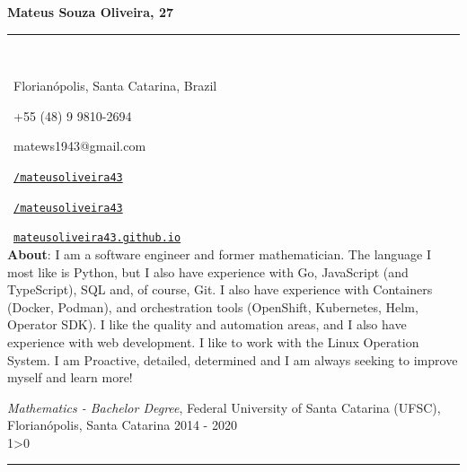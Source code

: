 \documentclass[a4paper,10pt]{article}
\makeatletter
\newcommand{\professional}{Mateus Souza Oliveira}
\newcommand{\age}{27}
\newcommand{\address}{Florianópolis, Santa Catarina, Brazil}
\newcommand{\phone}{+55 (48) 9 9810-2694}
\newcommand{\email}{matews1943@gmail.com}
\newcommand{\about}{
    I am a software engineer and former mathematician. The language I most like is Python, but I also have experience with Go, JavaScript (and TypeScript), SQL and, of course, Git. I also have experience with Containers (Docker, Podman), and orchestration tools (OpenShift, Kubernetes, Helm, Operator SDK). I like the quality and automation areas, and I also have experience with web development. I like to work with the Linux Operation System. I am Proactive, detailed, determined and I am always seeking to improve myself and learn more!
	\vspace{1\baselineskip}
}
\newcommand{\createSection}[4][0]{
	\begin{tcolorbox}[
        blanker,
        breakable,
        title=\begin{minipage}{0.16\linewidth}\large{\textbf{#2}}\vspace{-#3\baselineskip}\end{minipage},
        coltitle=black,
        leftupper=0.21\linewidth,
    ]
        #4
		\ifnum0#1>0 { \hrule {\ } } \fi
    \end{tcolorbox}
}
\makeatother
\begin{document}
	\begin{minipage}{0.65\linewidth}
		\Huge{\bf \professional, \age}\\\vspace{-1.75\baselineskip}

		\noindent\rule{\textwidth}{1.5pt} {\ }\\\vspace{-1.8\baselineskip}

		\large{
		\faMapMarker \ \address \\
		\begin{minipage}{0.5\linewidth}
			\faWhatsapp \ \phone
		\end{minipage}
		\begin{minipage}{0.5\linewidth}
			\faEnvelope \ \email
		\end{minipage}
		\begin{minipage}{0.5\linewidth}
			\faLinkedinSquare \ \href{https://www.linkedin.com/in/mateusoliveira43/}{\texttt{/mateusoliveira43}}
		\end{minipage}
		\begin{minipage}{0.5\linewidth}
			\faGithub \ \href{https://github.com/mateusoliveira43}{\texttt{/mateusoliveira43}}
		\end{minipage}
		\faLink \ \href{https://mateusoliveira43.github.io/}{\texttt{mateusoliveira43.github.io}}\\
		\vfill
		\textbf{About}:\about
		}
	\end{minipage}
	\vspace{\baselineskip}

    \createSection[1]{Education}{2}{
		\textit{Mathematics - Bachelor Degree}, Federal University of Santa Catarina (UFSC), Florianópolis, Santa Catarina \hfill 2014 - 2020 \\
	}
\end{document}
